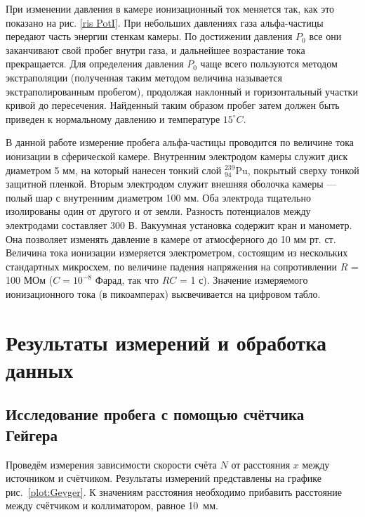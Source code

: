 \documentclass[a4paper, 12pt]{article}
\begin{document}
	При изменении давления в камере ионизационный ток меняется так, как это показано на рис. \ref{ris PotI}. При небольших давлениях газа
	альфа-частицы передают часть энергии стенкам камеры. По достижении
	давления $ P_0 $ все они заканчивают свой пробег внутри газа, и дальнейшее возрастание тока прекращается. Для определения давления $ P_0 $ чаще всего пользуются методом экстраполяции (полученная таким методом величина называется экстраполированным пробегом), продолжая наклонный и горизонтальный участки кривой до пересечения. Найденный таким образом пробег затем должен быть приведен к нормальному давлению и температуре $ 15 ^\circ C $.
	
	В данной работе измерение пробега альфа-частицы проводится по величине тока ионизации в сферической камере. Внутренним электродом
	камеры служит диск диаметром 5 мм, на который нанесен тонкий слой $ ^{239}_{94} $Pu, покрытый сверху тонкой защитной пленкой. Вторым электродом служит внешняя оболочка камеры --- полый шар с внутренним
	диаметром 100 мм. Оба электрода тщательно изолированы один от
	другого и от земли. Разность потенциалов между электродами составляет 300 В. Вакуумная установка содержит кран и манометр. Она позволяет изменять давление в камере от атмосферного до 10 мм рт. ст.
	Величина тока ионизации измеряется электрометром, состоящим из
	нескольких стандартных микросхем, по величине падения напряжения
	на сопротивлении $ R $ = 100 МОм ($ C = 10^{-8} $ Фарад, так что $ RC $ = 1 с).
	Значение измеряемого ионизационного тока (в пикоамперах) высвечивается на цифровом табло.

\section{Результаты измерений и обработка данных}

\subsection{Исследование пробега с помощью счётчика Гейгера}

Проведём измерения зависимости скорости счёта $N$ от расстояния $x$ между источником и счётчиком. Результаты измерений представлены на графике рис.~\ref{plot:Geyger}. К значениям расстояния необходимо прибавить расстояние между счётчиком и коллиматором, равное 10~мм.
\end{document}
